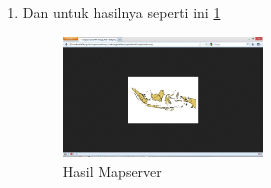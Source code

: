 \begin {enumerate}
\item Dan untuk hasilnya seperti ini \ref{gambar11}
\begin{figure}[ht]
	    \centerline{\includegraphics[width=0.50\textwidth]{figures/gambar11.JPG}}
	    \caption{Hasil Mapserver}
		\label{gambar11}
		\end{figure}
\end{enumerate}

